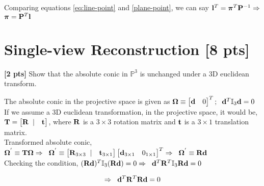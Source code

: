 \documentclass[11pt,addpoints,answers]{exam}
\numberwithin{equation}{section} %
\numberwithin{figure}{section} %
\numberwithin{table}{section} %
\begin{document}
\begin{questions}
\begin{tcolorbox}[fit,height=5cm, width=\textwidth, blank, borderline={0.5pt}{-2pt},halign=left, valign=center, nobeforeafter]
Comparing equations \ref{eq:line-point} and \ref{plane-point}, we can say $\mathbf{l}^T = \boldsymbol \pi^T\mathbf{P}^{-1}\Rightarrow$ \textcolor{red}{$\boldsymbol \pi = \mathbf{P}^T\mathbf{l}$}

\end{tcolorbox}

\section{Single-view Reconstruction [8 pts]}

\question \textbf{[2 pts]} Show that the absolute conic in $\mathbb{P}^3$ is unchanged under a 3D euclidean transform.

\begin{tcolorbox}[fit,height=5cm, width=\textwidth, blank, borderline={0.5pt}{-2pt},halign=left, valign=center, nobeforeafter]

The absolute conic in the projective space is given as  $\boldsymbol \Omega\equiv \begin{bmatrix} \mathbf{d}& 0 \end{bmatrix}^T;\hspace{0.2cm} \mathbf{d}^T \mathbb{I}_3 \mathbf{d}=0$\\
If we assume a 3D euclidean transformation, in the projective space, it would be, $\mathbf{T} = \begin{bmatrix} \mathbf{R} \hspace{0.2cm} |& \mathbf{t} \end{bmatrix}$, where $\mathbf{R}$ is a $3\times3$ rotation matrix and $\mathbf{t}$ is a $3\times1$ translation matrix.\\
Transformed absolute conic, $\boldsymbol \Omega^{'} \equiv \mathbf{T} \boldsymbol \Omega \Rightarrow\hspace{0.2cm} \boldsymbol \Omega^{'} \equiv \begin{bmatrix} \mathbf{R}_{3\times3} \hspace{0.2cm} |& \mathbf{t}_{3\times1} \end{bmatrix}\begin{bmatrix} \mathbf{d}_{3\times1}& 0_{1\times1} \end{bmatrix}^T \Rightarrow \hspace{0.2cm} \boldsymbol \Omega^{'}\equiv \mathbf{R} \mathbf{d}$\\
Checking the condition, $(\mathbf{R} \mathbf{d})^T \mathbb{I}_3  (\mathbf{R} \mathbf{d}) =0\Rightarrow \hspace{0.2cm} \mathbf{d}^T \mathbf{R}^T \mathbb{I}_3 \mathbf{R} \mathbf{d} =0$

\begin{equation}\label{eq:conic_rot}
    \Rightarrow\hspace{0.2cm} \mathbf{d}^T \mathbf{R}^T \mathbf{R} \mathbf{d} =0
\end{equation}


\end{tcolorbox}
\end{questions}
\end{document}
